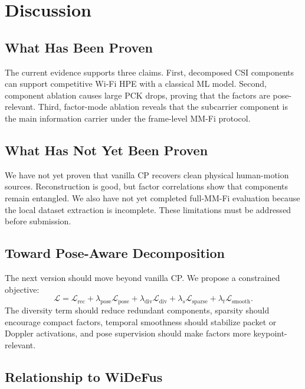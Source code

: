 \documentclass[letterpaper]{article}
\begin{document}
\section{Discussion}

\subsection{What Has Been Proven}

The current evidence supports three claims. First, decomposed CSI components can support competitive Wi-Fi HPE with a classical ML model. Second, component ablation causes large PCK drops, proving that the factors are pose-relevant. Third, factor-mode ablation reveals that the subcarrier component is the main information carrier under the frame-level MM-Fi protocol.

\subsection{What Has Not Yet Been Proven}

We have not yet proven that vanilla CP recovers clean physical human-motion sources. Reconstruction is good, but factor correlations show that components remain entangled. We also have not yet completed full-MM-Fi evaluation because the local dataset extraction is incomplete. These limitations must be addressed before submission.

\subsection{Toward Pose-Aware Decomposition}

The next version should move beyond vanilla CP. We propose a constrained objective:
\begin{equation}
    \mathcal{L}
    =
    \mathcal{L}_{\mathrm{rec}}
    +
    \lambda_{\mathrm{pose}}\mathcal{L}_{\mathrm{pose}}
    +
    \lambda_{\mathrm{div}}\mathcal{L}_{\mathrm{div}}
    +
    \lambda_s\mathcal{L}_{\mathrm{sparse}}
    +
    \lambda_t\mathcal{L}_{\mathrm{smooth}}.
\end{equation}
The diversity term should reduce redundant components, sparsity should encourage compact factors, temporal smoothness should stabilize packet or Doppler activations, and pose supervision should make factors more keypoint-relevant.

\subsection{Relationship to WiDeFus}
\end{document}
